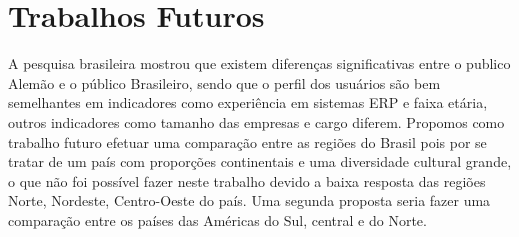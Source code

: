 \section{Trabalhos Futuros}

A pesquisa brasileira mostrou que existem diferenças significativas entre o publico Alemão e o público Brasileiro, sendo que o perfil dos usuários são bem semelhantes em indicadores como experiência em sistemas ERP e faixa etária, outros indicadores como tamanho das empresas e cargo diferem.\newline
\indent Propomos como trabalho futuro efetuar uma comparação entre as regiões do Brasil pois por se tratar de um país com proporções continentais e uma diversidade cultural grande, o que não foi possível fazer neste trabalho devido a baixa resposta das regiões Norte, Nordeste, Centro-Oeste do país.\newline
\indent Uma segunda proposta seria fazer uma comparação entre os países das Américas do Sul, central e do Norte.\newline

